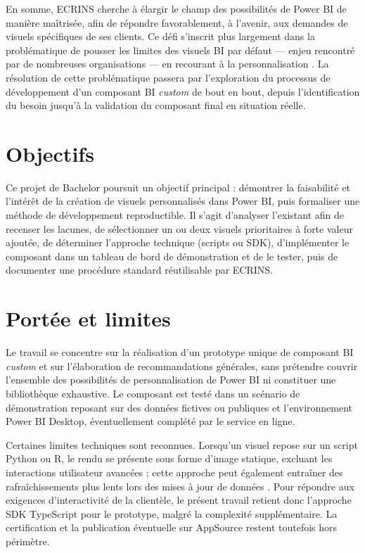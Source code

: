 En somme, ECRINS cherche à élargir le champ des possibilités de Power BI de manière maîtrisée, afin de répondre favorablement, à l’avenir, aux demandes de visuels spécifiques de ses clients. Ce défi s’inscrit plus largement dans la problématique de pousser les limites des visuels BI par défaut — enjeu rencontré par de nombreuses organisations — en recourant à la personnalisation \parencite{Uttam2025}. La résolution de cette problématique passera par l’exploration du processus de développement d’un composant BI \emph{custom} de bout en bout, depuis l’identification du besoin jusqu’à la validation du composant final en situation réelle.  

\section{Objectifs}

Ce projet de Bachelor poursuit un objectif principal : démontrer la faisabilité et l’intérêt de la création de visuels personnalisés dans Power BI, puis formaliser une méthode de développement reproductible. Il s’agit d’analyser l’existant afin de recenser les lacunes, de sélectionner un ou deux visuels prioritaires à forte valeur ajoutée, de déterminer l’approche technique (scripts ou SDK), d’implémenter le composant dans un tableau de bord de démonstration et de le tester, puis de documenter une procédure standard réutilisable par ECRINS.

\section{Portée et limites}

Le travail se concentre sur la réalisation d’un prototype unique de composant BI \emph{custom} et sur l’élaboration de recommandations générales, sans prétendre couvrir l’ensemble des possibilités de personnalisation de Power BI ni constituer une bibliothèque exhaustive. Le composant est testé dans un scénario de démonstration reposant sur des données fictives ou publiques et l’environnement Power BI Desktop, éventuellement complété par le service en ligne.  

Certaines limites techniques sont reconnues. Lorsqu’un visuel repose sur un script Python ou R, le rendu se présente sous forme d’image statique, excluant les interactions utilisateur avancées ; cette approche peut également entraîner des rafraîchissements plus lents lors des mises à jour de données \parencite{RealPython2023}. Pour répondre aux exigences d’interactivité de la clientèle, le présent travail retient donc l’approche SDK TypeScript pour le prototype, malgré la complexité supplémentaire. La certification et la publication éventuelle sur AppSource restent toutefois hors périmètre.

